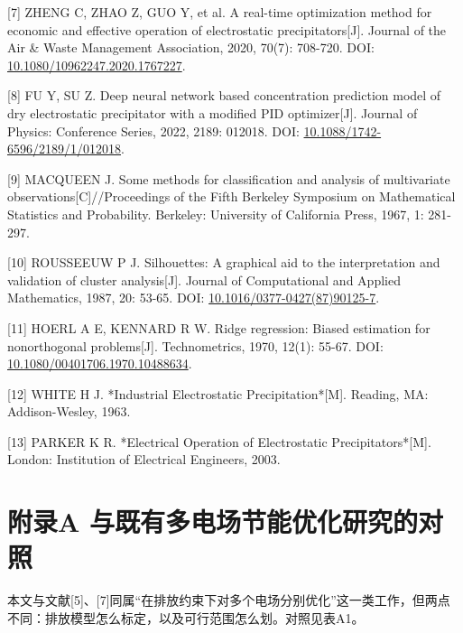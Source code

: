 \documentclass[UTF8,zihao=5,a4paper]{ctexart}
\begin{document}
[7] ZHENG C, ZHAO Z, GUO Y, et al. A real-time optimization method for economic and effective operation of electrostatic precipitators[J]. Journal of the Air \& Waste Management Association, 2020, 70(7): 708-720. DOI: \url{10.1080/10962247.2020.1767227}.

[8] FU Y, SU Z. Deep neural network based concentration prediction model of dry electrostatic precipitator with a modified PID optimizer[J]. Journal of Physics: Conference Series, 2022, 2189: 012018. DOI: \url{10.1088/1742-6596/2189/1/012018}.

[9] MACQUEEN J. Some methods for classification and analysis of multivariate observations[C]//Proceedings of the Fifth Berkeley Symposium on Mathematical Statistics and Probability. Berkeley: University of California Press, 1967, 1: 281-297.

[10] ROUSSEEUW P J. Silhouettes: A graphical aid to the interpretation and validation of cluster analysis[J]. Journal of Computational and Applied Mathematics, 1987, 20: 53-65. DOI: \url{10.1016/0377-0427(87)90125-7}.

[11] HOERL A E, KENNARD R W. Ridge regression: Biased estimation for nonorthogonal problems[J]. Technometrics, 1970, 12(1): 55-67. DOI: \url{10.1080/00401706.1970.10488634}.

[12] WHITE H J. *Industrial Electrostatic Precipitation*[M]. Reading, MA: Addison-Wesley, 1963.

[13] PARKER K R. *Electrical Operation of Electrostatic Precipitators*[M]. London: Institution of Electrical Engineers, 2003.

\section*{附录A 与既有多电场节能优化研究的对照}

本文与文献[5]、[7]同属“在排放约束下对多个电场分别优化”这一类工作，但两点不同：排放模型怎么标定，以及可行范围怎么划。对照见表A1。
\end{document}
